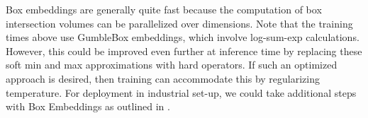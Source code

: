 {Box embeddings are generally quite fast because the computation of box intersection volumes can be parallelized over dimensions. Note that the training times above use GumbleBox embeddings, which involve log-sum-exp calculations. However, this could be improved even further at inference time by replacing these soft min and max approximations with hard operators. If such an optimized approach is desired, then training can accommodate this by regularizing temperature. For deployment in industrial set-up, we could take additional steps with Box Embeddings as outlined in \cite{box_for_search}.}